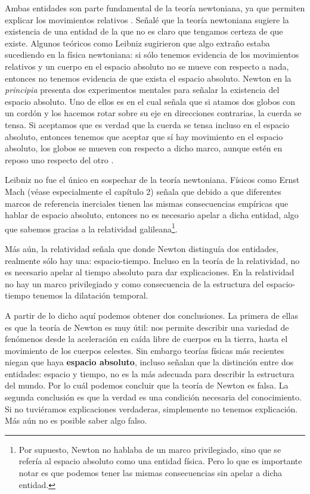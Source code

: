 \documentclass[12pt]{article}
\begin{document}
Ambas entidades son parte fundamental de la teoría newtoniana, ya que permiten explicar los movimientos relativos \cite{Maudlin2014Filosofia:7985}. Señalé que la teoría newtoniana sugiere la existencia de una entidad de la que no es claro que tengamos certeza de que existe. Algunos teóricos como Leibniz sugirieron que algo extraño estaba sucediendo en la física newtoniana: si sólo tenemos evidencia de los movimientos relativos y un cuerpo en el espacio absoluto no se mueve con respecto a nada, entonces no tenemos evidencia de que exista el espacio absoluto. Newton en la \textit{principia} presenta dos experimentos mentales para señalar la existencia del espacio absoluto. Uno de ellos es en el cual señala que si atamos dos globos con un cordón y los hacemos rotar sobre su eje en direcciones contrarias, la cuerda se tensa. Si aceptamos que es verdad que la cuerda se tensa incluso en el espacio absoluto, entonces tenemos que aceptar que sí hay movimiento en el espacio absoluto, los globos se mueven con respecto a dicho marco, aunque estén en reposo uno respecto del otro \cite[pp. 6-12]{book:360820}.

Leibniz no fue el único en sospechar de la teoría newtoniana. Físicos como Ernst Mach (véase especialmente el capítulo 2) \citeyear{Mach2013} señala que debido a que diferentes marcos de referencia inerciales tienen las mismas consecuencias empíricas que hablar de espacio absoluto, entonces no es necesario apelar a dicha entidad, algo que sabemos gracias a la relatividad galileana\footnote{Por supuesto, Newton no hablaba de un marco privilegiado, sino que se refería al espacio absoluto como una entidad física. Pero lo que es importante notar es que podemos tener las mismas consecuencias sin apelar a dicha entidad.}.

Más aún, la relatividad señala que donde Newton distinguía dos entidades, realmente sólo hay una: espacio-tiempo. Incluso en la teoría de la relatividad, no es necesario apelar al tiempo absoluto para dar explicaciones. En la relatividad no hay un marco privilegiado y como consecuencia de la estructura del espacio-tiempo tenemos la dilatación temporal.

A partir de lo dicho aquí podemos obtener dos conclusiones. La primera de ellas es que la teoría de Newton es muy útil: nos permite describir una variedad de fenómenos desde la aceleración en caída libre de cuerpos en la tierra, hasta el movimiento de los cuerpos celestes. Sin embargo teorías físicas más recientes niegan que haya \textbf{espacio absoluto}, incluso señalan que la distinción entre dos entidades: espacio y tiempo, no es la más adecuada para describir la estructura del mundo. Por lo cuál podemos concluir que la teoría de Newton es falsa. La segunda conclusión es que la verdad es una condición necesaria del conocimiento. Si no tuviéramos explicaciones verdaderas, simplemente no tenemos explicación. Más aún no es posible saber algo falso. 
\end{document}
